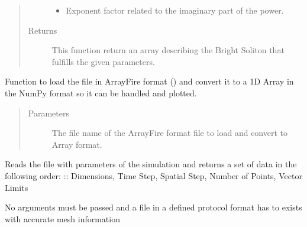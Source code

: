 \documentclass[letterpaper,10pt,english]{sphinxmanual}
\begin{document}
\begin{fulllineitems}
\begin{fulllineitems}
\begin{quote}
\begin{description}
\begin{itemize}
\item {} 
 \textendash{} Exponent factor related to the imaginary part of the power.

\end{itemize}

\item[{Returns}] \leavevmode
This function return an  array describing the Bright Soliton that fulfills the given parameters.

\end{description}\end{quote}

\end{fulllineitems}


\begin{fulllineitems}
\label{\detokenize{index:Loader.meshPlot.load_envelope}}
Function to load the file in ArrayFire format () and convert it to
a 1D Array in the NumPy format so it can be handled and plotted.
\begin{quote}\begin{description}
\item[{Parameters}] \leavevmode
{} \textendash{} The file name of the ArrayFire format file to load and convert to  Array format.

\end{description}\end{quote}

\end{fulllineitems}


\begin{fulllineitems}
\label{\detokenize{index:Loader.meshPlot.load_parameters}}
Reads the file with parameters of the simulation and returns a set
of data in the following order:
:: Dimensions, Time Step, Spatial Step, Number of Points, Vector Limits

No arguments must be passed and a file  in a defined protocol format has to exists with accurate mesh information

\end{fulllineitems}


\end{fulllineitems}
\end{document}
